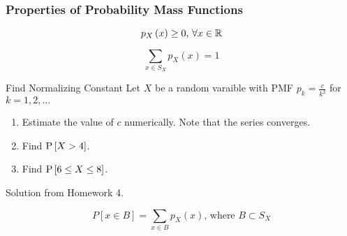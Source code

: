		\subsubsection{Properties of Probability Mass Functions} \label{subsubsec:Properties of Probability Mass Functions}
			\begin{propertylist}%
				\item
					\begin{equation}
						p_{X} \left( x \right) \geq 0 \text{, } \forall x \in \operatorname{\mathbb{R}}
					\end{equation}
				\item
					\begin{equation}
						\sum\limits_{x \in S_{X}} p_{X} \left( x \right) = 1
					\end{equation}
			\end{propertylist}
					\begin{example}[Problem 3.13]{Find Normalizing Constant}
					Let $X$ be a random varaible with PMF $p_{k} = \frac{c}{k^{2}}$ for $k = 1,2,\ldots$
						\begin{enumerate}[label=\textbf{(\alph*)}]
							\item Estimate the value of $c$ numerically. Note that the series converges.
							\item Find $\operatorname{\operatorname{P}} \left[ X > 4 \right]$.
							\item Find $\operatorname{\operatorname{P}} \left[ 6 \leq X \leq 8 \right]$.
						\end{enumerate}
					
					\tcblower
					
						Solution from Homework 4.
					\end{example}
			\begin{propertylist}[resume]
				\item
					\begin{equation}
						P \left[ x \in B \right] = \sum\limits_{x \in B} p_{X} \left( x \right) \text{, where } B \subset S_{X}
					\end{equation}
			\end{propertylist}
		
